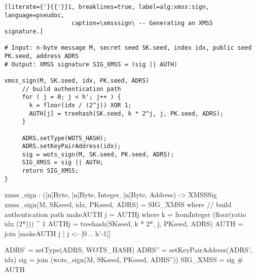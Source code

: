 \begin{lstlisting}[literate={'}{{'}}1, breaklines=true, label=alg:xmss:sign, language=pseudoc,
                   caption=\xmsssign\ -- Generating an XMSS signature.]

# Input: n-byte message M, secret seed SK.seed, index idx, public seed PK.seed, address ADRS
# Output: XMSS signature SIG_XMSS = (sig || AUTH)

xmss_sign(M, SK.seed, idx, PK.seed, ADRS)
     // build authentication path
     for ( j = 0; j < h'; j++ ) {
       k = floor(idx / (2^j)) XOR 1;
       AUTH[j] = treehash(SK.seed, k * 2^j, j, PK.seed, ADRS);
     }

     ADRS.setType(WOTS_HASH);
     ADRS.setKeyPairAddress(idx);
     sig = wots_sign(M, SK.seed, PK.seed, ADRS);
     SIG_XMSS = sig || AUTH;
     return SIG_XMSS;
}

\end{lstlisting}

\begin{code}
  xmss_sign : ([n]Byte, [n]Byte, Integer, [n]Byte, Address) -> XMSSSig
  xmss_sign(M, SKseed, idx, PKseed, ADRS) = SIG_XMSS where
    // build authentication path
    makeAUTH j = AUTHj where
      k = fromInteger (floor(ratio idx (2^^j))) ^ 1
      AUTHj = treehash(SKseed, k * 2^^j, j, PKseed, ADRS)
    AUTH = join [makeAUTH j | j <- [0 .. h'-1]]

    ADRS' = setType(ADRS, WOTS_HASH)
    ADRS'' = setKeyPairAddress(ADRS', idx)
    sig = join (wots_sign(M, SKseed, PKseed, ADRS''))
    SIG_XMSS = sig # AUTH
\end{code}

%
%
%
%

